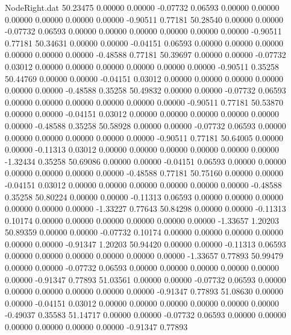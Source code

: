 \begin{filecontents}{NodeRight.dat}
  50.23475    0.00000    0.00000    -0.07732    0.06593    0.00000    0.00000    0.00000    0.00000    0.00000    0.00000   -0.90511    0.77181
  50.28540    0.00000    0.00000    -0.07732    0.06593    0.00000    0.00000    0.00000    0.00000    0.00000    0.00000   -0.90511    0.77181
  50.34631    0.00000    0.00000    -0.04151    0.06593    0.00000    0.00000    0.00000    0.00000    0.00000    0.00000   -0.48588    0.77181
  50.39697    0.00000    0.00000    -0.07732    0.03012    0.00000    0.00000    0.00000    0.00000    0.00000    0.00000   -0.90511    0.35258
  50.44769    0.00000    0.00000    -0.04151    0.03012    0.00000    0.00000    0.00000    0.00000    0.00000    0.00000   -0.48588    0.35258
  50.49832    0.00000    0.00000    -0.07732    0.06593    0.00000    0.00000    0.00000    0.00000    0.00000    0.00000   -0.90511    0.77181
  50.53870    0.00000    0.00000    -0.04151    0.03012    0.00000    0.00000    0.00000    0.00000    0.00000    0.00000   -0.48588    0.35258
  50.58928    0.00000    0.00000    -0.07732    0.06593    0.00000    0.00000    0.00000    0.00000    0.00000    0.00000   -0.90511    0.77181
  50.64005    0.00000    0.00000    -0.11313    0.03012    0.00000    0.00000    0.00000    0.00000    0.00000    0.00000   -1.32434    0.35258
  50.69086    0.00000    0.00000    -0.04151    0.06593    0.00000    0.00000    0.00000    0.00000    0.00000    0.00000   -0.48588    0.77181
  50.75160    0.00000    0.00000    -0.04151    0.03012    0.00000    0.00000    0.00000    0.00000    0.00000    0.00000   -0.48588    0.35258
  50.80224    0.00000    0.00000    -0.11313    0.06593    0.00000    0.00000    0.00000    0.00000    0.00000    0.00000   -1.33227    0.77643
  50.84298    0.00000    0.00000    -0.11313    0.10174    0.00000    0.00000    0.00000    0.00000    0.00000    0.00000   -1.33657    1.20203
  50.89359    0.00000    0.00000    -0.07732    0.10174    0.00000    0.00000    0.00000    0.00000    0.00000    0.00000   -0.91347    1.20203
  50.94420    0.00000    0.00000    -0.11313    0.06593    0.00000    0.00000    0.00000    0.00000    0.00000    0.00000   -1.33657    0.77893
  50.99479    0.00000    0.00000    -0.07732    0.06593    0.00000    0.00000    0.00000    0.00000    0.00000    0.00000   -0.91347    0.77893
  51.03561    0.00000    0.00000    -0.07732    0.06593    0.00000    0.00000    0.00000    0.00000    0.00000    0.00000   -0.91347    0.77893
  51.08630    0.00000    0.00000    -0.04151    0.03012    0.00000    0.00000    0.00000    0.00000    0.00000    0.00000   -0.49037    0.35583
  51.14717    0.00000    0.00000    -0.07732    0.06593    0.00000    0.00000    0.00000    0.00000    0.00000    0.00000   -0.91347    0.77893

\end{filecontents}

